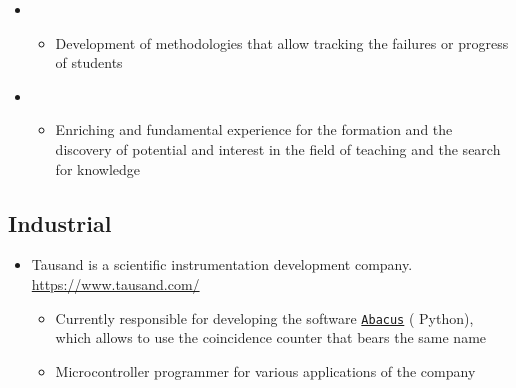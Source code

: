 \documentclass[11pt, letterpaper, sans]{moderncv}        %
\begin{document}
\begin{itemize}
{{\begin{itemize}
					\end{itemize} 
				}
			}
			\vspace{6pt}
			\item
			{
				{
					\vspace{3pt}
					\begin{itemize}
						\item Development of methodologies that allow tracking the failures or progress of students
					\end{itemize}
				}
			}
			\vspace{6pt}
			
			\item{
				{
					\vspace{3pt}
					\begin{itemize}
						\item Enriching and fundamental experience for the formation and the discovery of potential and interest in the field of teaching and the search for knowledge
					\end{itemize}
				}
			}
		\end{itemize}
	\vspace{6pt}
	\subsection{Industrial}
		\begin{itemize}
			\item
			{
				{
					Tausand is a scientific instrumentation development company. \url{https://www.tausand.com/}
					\vspace{3pt}
					\begin{itemize}
						\item 
						Currently responsible for developing the software \href{https://www.tausand.com/downloads/}{\texttt{Abacus}} ({\color{blue} Python}), which allows to use the coincidence counter that bears the same name
						\item Microcontroller programmer for various applications of the company
					\end{itemize}
				}
			}
			\vspace{6pt}
		\end{itemize}
\end{document}
